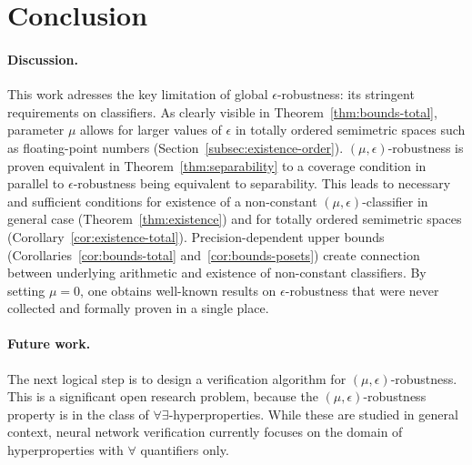\section{Conclusion}

\paragraph{Discussion.} This work adresses the key limitation of global $\epsilon$-robustness: its stringent requirements on classifiers. As clearly visible in Theorem~\ref{thm:bounds-total}, parameter $\mu$ allows for larger values of $\epsilon$ in totally ordered semimetric spaces such as floating-point numbers (Section~\ref{subsec:existence-order}). $(\mu,\epsilon)$-robustness is proven equivalent in Theorem~\ref{thm:separability} to a coverage condition in parallel to $\epsilon$-robustness being equivalent to separability. This leads to necessary and sufficient conditions for existence of a non-constant $(\mu, \epsilon)$-classifier in general case (Theorem~\ref{thm:existence}) and for totally ordered semimetric spaces (Corollary~\ref{cor:existence-total}). Precision-dependent upper bounds (Corollaries~\ref{cor:bounds-total} and~\ref{cor:bounds-posets}) create connection between underlying arithmetic and existence of non-constant classifiers. By setting $\mu = 0$, one obtains well-known results on $\epsilon$-robustness that were never collected and formally proven in a single place.

\paragraph{Future work.} The next logical step is to design a verification algorithm for $(\mu,\epsilon)$-robustness. This is a significant open research problem, because the $(\mu,\epsilon)$-robustness property is in the class of $\forall\exists$-hyperproperties. While these are studied in general context, neural network verification currently focuses on the domain of hyperproperties with $\forall$ quantifiers only.
